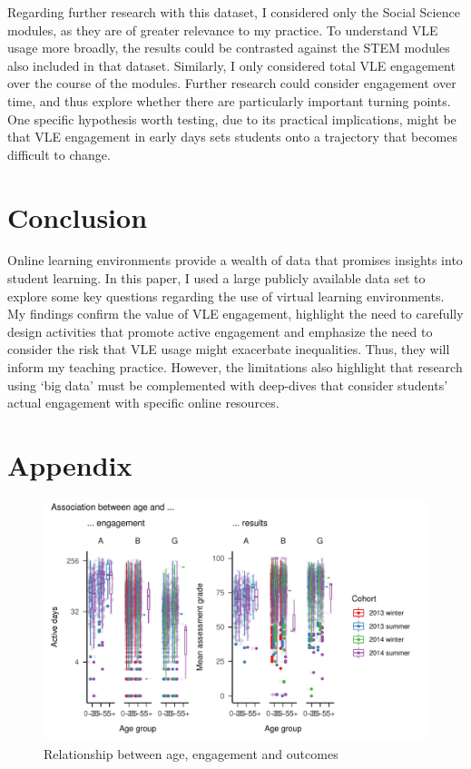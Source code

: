 \documentclass[
  english,
  man,mask,floatsintext]{apa6}
\begin{document}
Regarding further research with this dataset, I considered only the Social Science modules, as they are of greater relevance to my practice. To understand VLE usage more broadly, the results could be contrasted against the STEM modules also included in that dataset. Similarly, I only considered total VLE engagement over the course of the modules. Further research could consider engagement over time, and thus explore whether there are particularly important turning points. One specific hypothesis worth testing, due to its practical implications, might be that VLE engagement in early days sets students onto a trajectory that becomes difficult to change.

\hypertarget{conclusion}{%
\section{Conclusion}\label{conclusion}}

Online learning environments provide a wealth of data that promises insights into student learning. In this paper, I used a large publicly available data set to explore some key questions regarding the use of virtual learning environments. My findings confirm the value of VLE engagement, highlight the need to carefully design activities that promote active engagement and emphasize the need to consider the risk that VLE usage might exacerbate inequalities. Thus, they will inform my teaching practice. However, the limitations also highlight that research using `big data' must be complemented with deep-dives that consider students' actual engagement with specific online resources.

\newpage

\hypertarget{appendix}{%
\section{Appendix}\label{appendix}}

\begin{figure}
\centering
\includegraphics{Assigment-2---OU-data_files/figure-latex/unnamed-chunk-9-1.pdf}
\caption{\label{fig:unnamed-chunk-9}Relationship between age, engagement and outcomes \label{fig:exp7}}
\end{figure}
\end{document}
